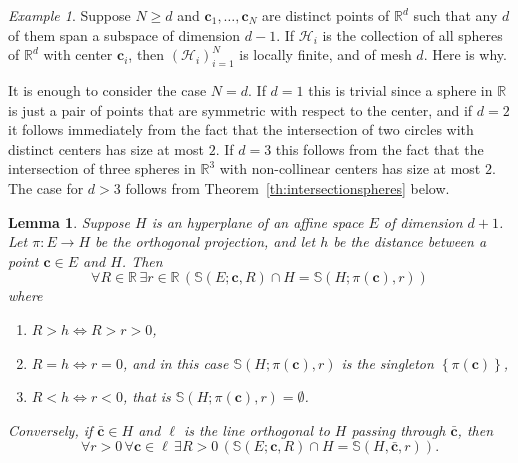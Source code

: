 \documentclass[12pt]{amsart}
\newcommand{\FORALL}[1]{\forall {#1} \, }
\newcommand{\EXISTS}[1]{\exists {#1} \, }
\newcommand{\R}{\mathbb{R}}	%
\newcommand{\IFF}{\Leftrightarrow}
\newcommand{\setLR}[1]{\left \{ {#1} \right \}} %
\theoremstyle{plain}
\newtheorem{lemma}[theorem]{Lemma}
\theoremstyle{definition}
\theoremstyle{remark}
\newtheorem{example}[theorem]{Example}
\begin{document}
\begin{example}\label{xmp:well-placed}
Suppose \( N \geq d \) and \( \mathbf{c}_1 , \dots , \mathbf{c}_N \) are distinct points of \( \R^d \) such that any \( d \) of them span a subspace of dimension \( d - 1 \).
If \( \mathcal{H}_i \) is the collection of all spheres of \( \R^d \) with center \( \mathbf{c}_i \), then \( ( \mathcal{H}_i )_{ i = 1 }^N \) is locally finite, and of mesh \( d \).
Here is why.

It is enough to consider the case \( N = d \).
If \( d = 1 \) this is trivial since a sphere in \( \R \) is just a pair of points that are symmetric with respect to the center, and if \( d = 2 \) it follows immediately from the fact that the intersection of two circles with distinct centers has size at most \( 2 \).
If \( d = 3 \) this follows from the fact that the intersection of three spheres in \( \R^3 \) with non-collinear centers has size at most \( 2 \).
The case for \( d > 3 \) follows from Theorem~\ref{th:intersectionspheres} below.
\end{example}

\begin{lemma}\label{lem:intersectionspherewithhyperplane}
Suppose \( H \) is an hyperplane of an affine space \( E \) of dimension \( d + 1 \).
Let \( \pi \colon E \to H \) be the orthogonal projection, and let \( h \) be the distance between a point \( \mathbf{c} \in E \) and \( H \).
Then
\[
 \FORALL{R \in \R}\EXISTS{r \in \R}\left ( \mathbb{S} ( E ; \mathbf{c} , R ) \cap H = \mathbb{S} ( H ; \pi ( \mathbf{c} ) , r ) \right )
\]
where
\begin{enumerate}[label={\upshape (\roman*)}]
\item\label{lem:intersectionspherewithhyperplane-i}
\( R > h \IFF R > r > 0 \),
\item\label{lem:intersectionspherewithhyperplane-ii}
\( R = h \IFF r = 0 \), and in this case \( \mathbb{S}( H ; \pi ( \mathbf{c} ) , r ) \) is the singleton \( \setLR{ \pi ( \mathbf{c} ) } \),
\item\label{lem:intersectionspherewithhyperplane-iii}
\( R < h \IFF r < 0 \), that is \( \mathbb{S} ( H ; \pi ( \mathbf{c} ) , r ) = \emptyset \). 
\end{enumerate}

Conversely, if \( \bar{\mathbf{c}} \in H \) and \( \ell \) is the line orthogonal to \( H \) passing through \(\bar{ \mathbf{c}} \), then 
\[
\FORALL{ r > 0 } \FORALL{ \mathbf{c} \in \ell } \EXISTS{R > 0 } \left ( \mathbb{S} ( E ; \mathbf{c} , R ) \cap H = \mathbb{S} ( H , \bar{\mathbf{c}} , r ) \right ) .
\]
\end{lemma}
\end{document}
